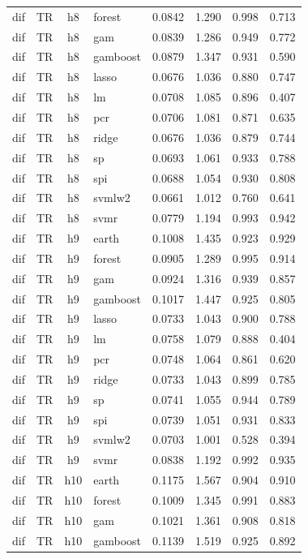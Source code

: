 \begin{ThreePartTable}
\begin{longtable}[t]{llclcccc}
dif & TR & h8 & forest & 0.0842 & 1.290 & 0.998 & 0.713\\
dif & TR & h8 & gam & 0.0839 & 1.286 & 0.949 & 0.772\\
dif & TR & h8 & gamboost & 0.0879 & 1.347 & 0.931 & 0.590\\
dif & TR & h8 & lasso & 0.0676 & 1.036 & 0.880 & 0.747\\
dif & TR & h8 & lm & 0.0708 & 1.085 & 0.896 & 0.407\\
dif & TR & h8 & pcr & 0.0706 & 1.081 & 0.871 & 0.635\\
dif & TR & h8 & ridge & 0.0676 & 1.036 & 0.879 & 0.744\\
dif & TR & h8 & sp & 0.0693 & 1.061 & 0.933 & 0.788\\
dif & TR & h8 & spi & 0.0688 & 1.054 & 0.930 & 0.808\\
dif & TR & h8 & svmlw2 & 0.0661 & 1.012 & 0.760 & 0.641\\
dif & TR & h8 & svmr & 0.0779 & 1.194 & 0.993 & 0.942\\
\addlinespace
dif & TR & h9 & earth & 0.1008 & 1.435 & 0.923 & 0.929\\
dif & TR & h9 & forest & 0.0905 & 1.289 & 0.995 & 0.914\\
dif & TR & h9 & gam & 0.0924 & 1.316 & 0.939 & 0.857\\
dif & TR & h9 & gamboost & 0.1017 & 1.447 & 0.925 & 0.805\\
dif & TR & h9 & lasso & 0.0733 & 1.043 & 0.900 & 0.788\\
dif & TR & h9 & lm & 0.0758 & 1.079 & 0.888 & 0.404\\
dif & TR & h9 & pcr & 0.0748 & 1.064 & 0.861 & 0.620\\
dif & TR & h9 & ridge & 0.0733 & 1.043 & 0.899 & 0.785\\
dif & TR & h9 & sp & 0.0741 & 1.055 & 0.944 & 0.789\\
dif & TR & h9 & spi & 0.0739 & 1.051 & 0.931 & 0.833\\
dif & TR & h9 & svmlw2 & 0.0703 & 1.001 & 0.528 & 0.394\\
dif & TR & h9 & svmr & 0.0838 & 1.192 & 0.992 & 0.935\\
\addlinespace
dif & TR & h10 & earth & 0.1175 & 1.567 & 0.904 & 0.910\\
dif & TR & h10 & forest & 0.1009 & 1.345 & 0.991 & 0.883\\
dif & TR & h10 & gam & 0.1021 & 1.361 & 0.908 & 0.818\\
dif & TR & h10 & gamboost & 0.1139 & 1.519 & 0.925 & 0.892\\

\end{longtable}
\end{ThreePartTable}
